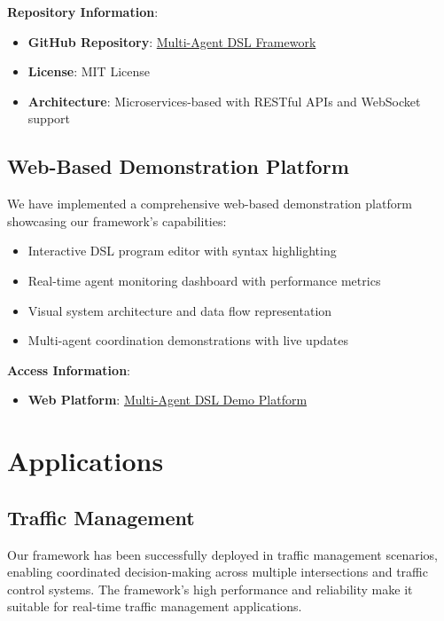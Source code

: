 \documentclass[conference]{IEEEtran}
\begin{document}
\textbf{Repository Information}:
\begin{itemize}
\item \textbf{GitHub Repository}: \href{https://github.com/Max-YUAN-22/Multi-Agent_DSLframework-2025}{Multi-Agent DSL Framework}
\item \textbf{License}: MIT License
\item \textbf{Architecture}: Microservices-based with RESTful APIs and WebSocket support
\end{itemize}

\subsection{Web-Based Demonstration Platform}

We have implemented a comprehensive web-based demonstration platform showcasing our framework's capabilities:

\begin{itemize}
\item Interactive DSL program editor with syntax highlighting
\item Real-time agent monitoring dashboard with performance metrics
\item Visual system architecture and data flow representation
\item Multi-agent coordination demonstrations with live updates
\end{itemize}

\textbf{Access Information}:
\begin{itemize}
\item \textbf{Web Platform}: \href{https://max-yuan-22.github.io/Final-DSL/}{Multi-Agent DSL Demo Platform}
\end{itemize}

\section{Applications}

\subsection{Traffic Management}

Our framework has been successfully deployed in traffic management scenarios, enabling coordinated decision-making across multiple intersections and traffic control systems. The framework's high performance and reliability make it suitable for real-time traffic management applications.
\end{document}

